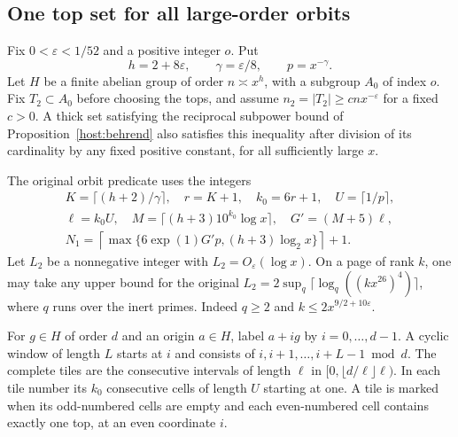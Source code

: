 \subsection{One top set for all large-order orbits}\label{orb:section}

Fix \(0<\varepsilon<1/52\) and a positive integer \(o\). Put
\[
 h=2+8\varepsilon,\qquad \gamma=\varepsilon/8,\qquad p=x^{-\gamma}.
\]
Let \(H\) be a finite abelian group of order \(n\asymp x^h\), with a
subgroup \(A_0\) of index \(o\). Fix \(T_2\subset A_0\) before choosing
the tops, and assume \(n_2=|T_2|\ge c n x^{-\varepsilon}\) for a
fixed \(c>0\). A thick set satisfying the reciprocal subpower bound of
Proposition~\ref{host:behrend} also satisfies this inequality after division
of its cardinality by any fixed positive constant, for all sufficiently
large \(x\).

The original orbit predicate uses the integers
\[
\begin{gathered}
 K=\lceil(h+2)/\gamma\rceil,\quad r=K+1,\quad k_0=6r+1,\quad
 U=\lceil1/p\rceil,\\
 \ell=k_0 U,\quad M=\lceil (h+3)10^{k_0}\log x\rceil,\quad
 G'=(M+5)\ell,\\
 N_1=\left\lceil\max\{6\exp(1)G'p,(h+3)\log_2 x\}\right\rceil+1 .
\end{gathered}
\]
Let \(L_2\) be a nonnegative integer with \(L_2=O_\varepsilon(\log x)\).
On a page of rank \(k\), one may take any upper bound for the original
\(L_2=2\sup_q\lceil\log_q((k x^{26})^4)\rceil\), where \(q\) runs
over the inert primes. Indeed \(q\ge2\) and \(k\le2x^{9/2+10\varepsilon}\).

For \(g\in H\) of order \(d\) and an origin \(a\in H\), label
\(a+ig\) by \(i=0,\ldots,d-1\). A cyclic window of length \(L\) starts
at \(i\) and consists of \(i,i+1,\ldots,i+L-1\bmod d\). The complete
tiles are the consecutive intervals of length \(\ell\) in
\([0,\lfloor d/\ell\rfloor\ell)\). In each tile number its \(k_0\)
consecutive cells of length \(U\) starting at one. A tile is marked
when its odd-numbered cells are empty and each even-numbered cell
contains exactly one top, at an even coordinate \(i\).

